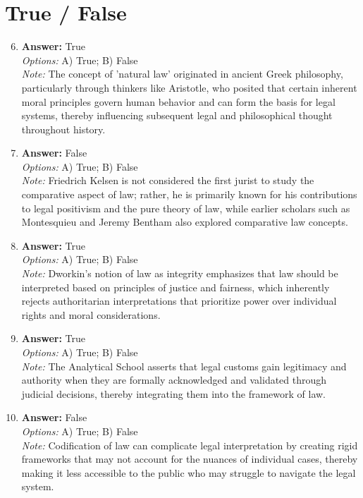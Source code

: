 \documentclass[12pt]{article}
\begin{document}
\section*{True / False}
\begin{enumerate}[label=\arabic*.]
\setcounter{enumi}{5}
\item \textbf{Answer:} True
\\ \textit{Options:} A) True; B) False
\\ \textit{Note:} The concept of 'natural law' originated in ancient Greek philosophy, particularly through thinkers like Aristotle, who posited that certain inherent moral principles govern human behavior and can form the basis for legal systems, thereby influencing subsequent legal and philosophical thought throughout history.
\item \textbf{Answer:} False
\\ \textit{Options:} A) True; B) False
\\ \textit{Note:} Friedrich Kelsen is not considered the first jurist to study the comparative aspect of law; rather, he is primarily known for his contributions to legal positivism and the pure theory of law, while earlier scholars such as Montesquieu and Jeremy Bentham also explored comparative law concepts.
\item \textbf{Answer:} True
\\ \textit{Options:} A) True; B) False
\\ \textit{Note:} Dworkin's notion of law as integrity emphasizes that law should be interpreted based on principles of justice and fairness, which inherently rejects authoritarian interpretations that prioritize power over individual rights and moral considerations.
\item \textbf{Answer:} True
\\ \textit{Options:} A) True; B) False
\\ \textit{Note:} The Analytical School asserts that legal customs gain legitimacy and authority when they are formally acknowledged and validated through judicial decisions, thereby integrating them into the framework of law.
\item \textbf{Answer:} False
\\ \textit{Options:} A) True; B) False
\\ \textit{Note:} Codification of law can complicate legal interpretation by creating rigid frameworks that may not account for the nuances of individual cases, thereby making it less accessible to the public who may struggle to navigate the legal system.
\end{enumerate}
\end{document}
